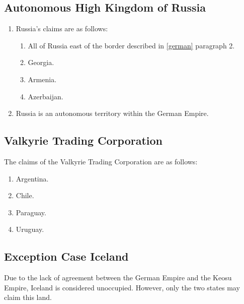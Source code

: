 \documentclass{article}
\begin{document}
\subsection{Autonomous High Kingdom of Russia}
\begin{enumerate}[(1)]
    \item Russia's claims are as follows:
    \begin{enumerate}[1.]
        \item All of Russia east of the border described in \ref{german} paragraph 2.
        \item Georgia.
        \item Armenia.
        \item Azerbaijan.
    \end{enumerate}
    \item Russia is an autonomous territory within the German Empire.
\end{enumerate}

\subsection{Valkyrie Trading Corporation}
The claims of the Valkyrie Trading Corporation are as follows:
\begin{enumerate}
    \item Argentina.
    \item Chile.
    \item Paraguay.
    \item Uruguay.
\end{enumerate}

\subsection{Exception Case Iceland}
Due to the lack of agreement between the German Empire and the Keosu Empire, Iceland is considered unoccupied. However, only the two states may claim this land.
\end{document}
